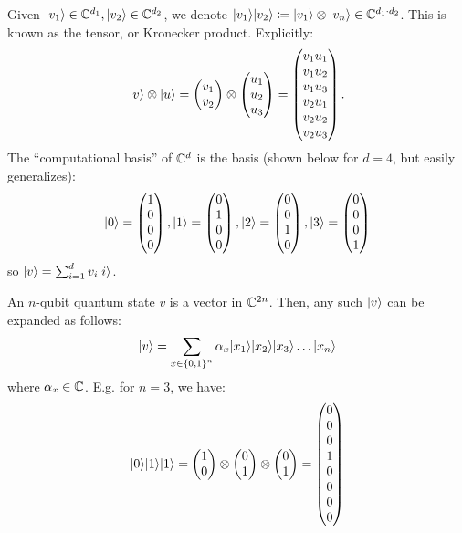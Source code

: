 Given $\lvert v_1 \rangle \in \mathbb{C}^{d_1}, \lvert v_2 \rangle \in \mathbb{C}^{d_2}$, we denote $\lvert v_1 \rangle\lvert v_2 \rangle \coloneqq \lvert v_1 \rangle \otimes \lvert v_n \rangle \in \mathbb{C}^{d_1 \cdot d_2}$. This is known as the tensor, or Kronecker product. Explicitly:
\begin{equation}
    \lvert v \rangle \otimes \lvert u \rangle = \begin{pmatrix}v_1 \\ v_2\end{pmatrix} \otimes \begin{pmatrix}u_1 \\ u_2 \\ u_3\end{pmatrix} = \begin{pmatrix}v_1u_1 \\ v_1 u_2 \\ v_1 u_3 \\ v_2 u_1 \\ v_2 u_2 \\ v_2 u_3\end{pmatrix}.
\end{equation}
The ``computational basis'' of $\mathbb{C}^d$ is the basis (shown below for $d = 4$, but easily generalizes):
\begin{equation}
    \lvert 0 \rangle = \begin{pmatrix}1 \\ 0 \\ 0 \\ 0\end{pmatrix}, \lvert 1 \rangle = \begin{pmatrix}0 \\ 1 \\ 0 \\ 0\end{pmatrix}, \lvert 2 \rangle = \begin{pmatrix}0 \\ 0 \\ 1 \\ 0\end{pmatrix}, \lvert 3 \rangle = \begin{pmatrix}0 \\ 0 \\ 0 \\ 1\end{pmatrix}
\end{equation}
so $\lvert v \rangle = \sum_{i=1}^d v_i \lvert i \rangle$. 

An $n$-qubit quantum state $v$ is a vector in $\mathbb{C}^{2n}$. Then, any such $\lvert v \rangle$ can be expanded as follows:
\begin{equation}
    \lvert v \rangle = \sum_{x \in \set{0, 1}^n}\alpha_x \lvert x_1 \rangle\lvert x_2 \rangle\lvert x_3 \rangle\ldots \lvert x_n \rangle
\end{equation}
where $\alpha_x \in \mathbb{C}$. E.g. for $n = 3$, we have:
\begin{equation}
    \lvert 0 \rangle\lvert 1 \rangle\lvert 1 \rangle = \begin{pmatrix}1 \\ 0\end{pmatrix} \otimes \begin{pmatrix}0 \\ 1\end{pmatrix} \otimes \begin{pmatrix}0 \\ 1\end{pmatrix} = \begin{pmatrix}0\\0\\0\\1\\0\\0\\0\\0\end{pmatrix}
\end{equation}

